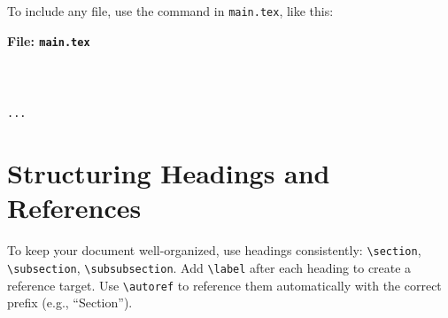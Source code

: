 \documentclass{VISTEC}
\begin{document}
\begin{paragraph}
To include any file, use the \verb|| command in \texttt{main.tex}, like this:
\end{paragraph}

\noindent\textbf{File: \texttt{main.tex}}\vspace{-1.5em}
\begin{verbatim}



...

\end{verbatim}







\section{Structuring Headings and References}
\label{manual:headings}

\begin{paragraph}
To keep your document well-organized, use headings consistently: \verb|\section|, \verb|\subsection|, \verb|\subsubsection|. Add \verb|\label| after each heading to create a reference target. Use \verb|\autoref| to reference them automatically with the correct prefix (e.g., ``Section'').
\end{paragraph}
\end{document}
